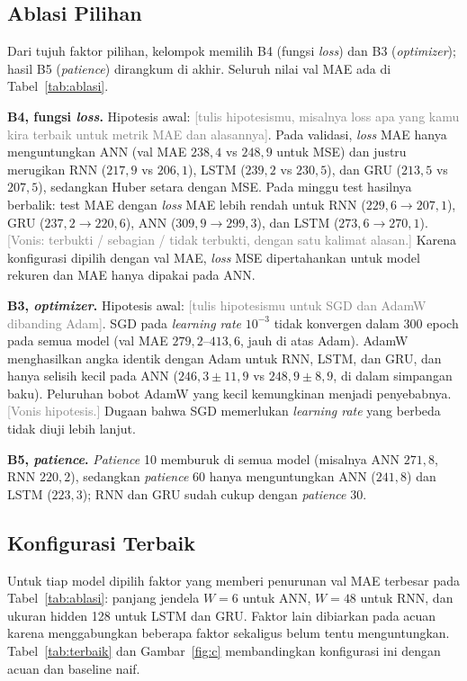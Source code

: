 \documentclass[conference,a4paper]{IEEEtran}
\newcommand{\petunjuk}[1]{\textcolor{gray}{[#1]}}
\begin{document}
\subsection{Ablasi Pilihan}
Dari tujuh faktor pilihan, kelompok memilih B4 (fungsi \textit{loss}) dan B3 (\textit{optimizer}); hasil B5 (\textit{patience}) dirangkum di akhir. Seluruh nilai val MAE ada di Tabel~\ref{tab:ablasi}.

\textbf{B4, fungsi \textit{loss}.} Hipotesis awal: \petunjuk{tulis hipotesismu, misalnya loss apa yang kamu kira terbaik untuk metrik MAE dan alasannya}. Pada validasi, \textit{loss} MAE hanya menguntungkan ANN (val MAE $238{,}4$ vs $248{,}9$ untuk MSE) dan justru merugikan RNN ($217{,}9$ vs $206{,}1$), LSTM ($239{,}2$ vs $230{,}5$), dan GRU ($213{,}5$ vs $207{,}5$), sedangkan Huber setara dengan MSE. Pada minggu test hasilnya berbalik: test MAE dengan \textit{loss} MAE lebih rendah untuk RNN ($229{,}6 \rightarrow 207{,}1$), GRU ($237{,}2 \rightarrow 220{,}6$), ANN ($309{,}9 \rightarrow 299{,}3$), dan LSTM ($273{,}6 \rightarrow 270{,}1$). \petunjuk{Vonis: terbukti / sebagian / tidak terbukti, dengan satu kalimat alasan.} Karena konfigurasi dipilih dengan val MAE, \textit{loss} MSE dipertahankan untuk model rekuren dan MAE hanya dipakai pada ANN.

\textbf{B3, \textit{optimizer}.} Hipotesis awal: \petunjuk{tulis hipotesismu untuk SGD dan AdamW dibanding Adam}. SGD pada \textit{learning rate} $10^{-3}$ tidak konvergen dalam 300 epoch pada semua model (val MAE $279{,}2$--$413{,}6$, jauh di atas Adam). AdamW menghasilkan angka identik dengan Adam untuk RNN, LSTM, dan GRU, dan hanya selisih kecil pada ANN ($246{,}3 \pm 11{,}9$ vs $248{,}9 \pm 8{,}9$, di dalam simpangan baku). Peluruhan bobot AdamW yang kecil kemungkinan menjadi penyebabnya. \petunjuk{Vonis hipotesis.} Dugaan bahwa SGD memerlukan \textit{learning rate} yang berbeda tidak diuji lebih lanjut.

\textbf{B5, \textit{patience}.} \textit{Patience} 10 memburuk di semua model (misalnya ANN $271{,}8$, RNN $220{,}2$), sedangkan \textit{patience} 60 hanya menguntungkan ANN ($241{,}8$) dan LSTM ($223{,}3$); RNN dan GRU sudah cukup dengan \textit{patience} 30.

\subsection{Konfigurasi Terbaik}
Untuk tiap model dipilih faktor yang memberi penurunan val MAE terbesar pada Tabel~\ref{tab:ablasi}: panjang jendela $W=6$ untuk ANN, $W=48$ untuk RNN, dan ukuran hidden 128 untuk LSTM dan GRU. Faktor lain dibiarkan pada acuan karena menggabungkan beberapa faktor sekaligus belum tentu menguntungkan. Tabel~\ref{tab:terbaik} dan Gambar~\ref{fig:c} membandingkan konfigurasi ini dengan acuan dan baseline naif.
\end{document}
